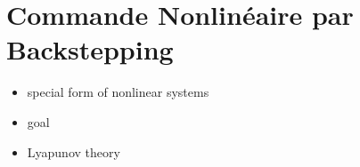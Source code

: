 \graphicspath{{Figures/}}
\chapter{Commande Nonlinéaire par Backstepping} \label{chap:backstepping}

\begin{itemize}
	\item special form of nonlinear systems
	\item goal
	\item Lyapunov theory
	
\end{itemize}